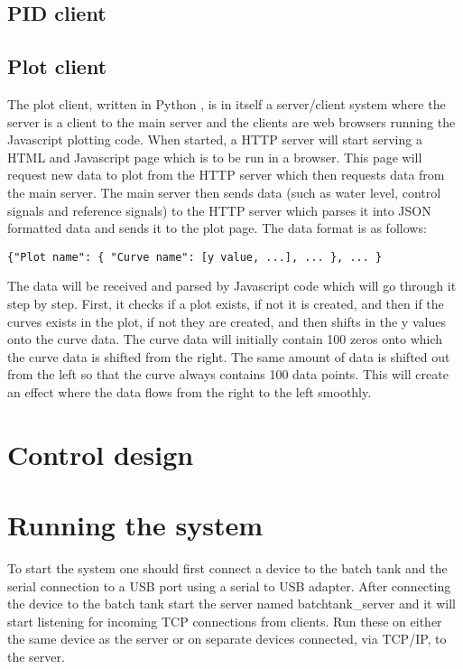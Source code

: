 \documentclass{article}
\begin{document}
\subsection{PID client}

\subsection{Plot client}
The plot client, written in Python \cite{python}, is in itself a server/client system where the server is a client to the main server and the clients are web browsers running the Javascript plotting code. When started, a HTTP server will start serving a HTML and Javascript page which is to be run in a browser. This page will request new data to plot from the HTTP server which then requests data from the main server. The main server then sends data (such as water level, control signals and reference signals) to the HTTP server which parses it into JSON \cite{json} formatted data and sends it to the plot page. The data format is as follows:
\begin{verbatim}
{"Plot name": { "Curve name": [y value, ...], ... }, ... }
\end{verbatim}
The data will be received and parsed by Javascript code which will go through it step by step. First, it checks if a plot exists, if not it is created, and then if the curves exists in the plot, if not they are created, and then shifts in the y values onto the curve data. The curve data will initially contain 100 zeros onto which the curve data is shifted from the right. The same amount of data is shifted out from the left so that the curve always contains 100 data points. This will create an effect where the data flows from the right to the left smoothly.

\section{Control design}


\section{Running the system}
To start the system one should first connect a device to the batch tank and the serial connection to a USB port using a serial to USB adapter. After connecting the device to the batch tank start the server named batchtank\_server and it will start listening for incoming TCP connections from clients. Run these on either the same device as the server or on separate devices connected, via TCP/IP, to the server.
\end{document}
